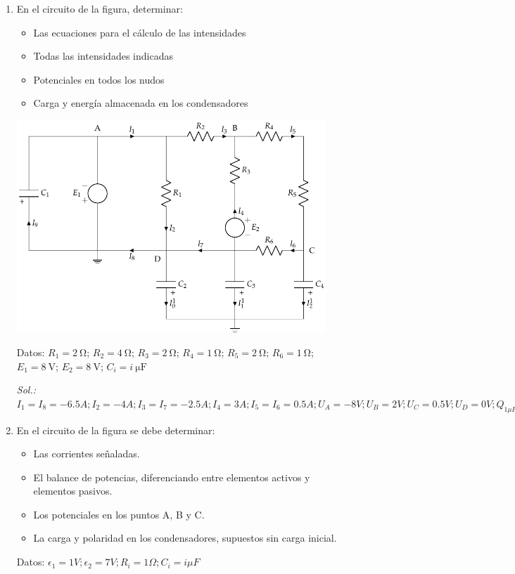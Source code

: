 \begin{enumerate}
\item En el circuito de la figura, determinar:
  \begin{itemize}
  \item Las ecuaciones para el cálculo de las intensidades
  \item Todas las intensidades indicadas
  \item Potenciales en todos los nudos
  \item Carga y energía almacenada en los condensadores
  \end{itemize}
  
  \begin{center}
    \includegraphics[height=8cm]{../figs/ej11_BT1.pdf}
  \end{center}


  Datos: $R_1 = \qty{2}{\ohm}$; $R_2 = \qty{4}{\ohm}$; $R_3 = \qty{2}{\ohm}$; $R_4 = \qty{1}{\ohm}$; $R_5 = \qty{2}{\ohm}$; $R_6 = \qty{1}{\ohm}$; $E_1 = \qty{8}{\volt}$; $E_2 = \qty{8}{\volt}$; $C_i = \qty[parse-numbers=false]{i}{\micro\farad}$

  \emph{Sol.:
    $I_1=I_8=-6.5A; I_2=-4A; I_3=I_7=-2.5A; I_4=3A; I_5=I_6=0.5A; U_A=-8V;
    U_B=2V; U_C=0.5V; U_D=0V;Q_{1\mu F}=8\mu C; Q_{2\mu F}=Q_{3\mu
      F}=0\mu C; Q_{4\mu F}=-2\mu C; E_{1\mu F}=32\mu J; E_{2\mu
      F}=E_{3\mu F}=0 J; E_{4\mu F}=0.5\mu J$}

\item En el circuito de la figura se debe determinar:
  \begin{itemize}
  \item Las corrientes señaladas.
  \item El balance de potencias, diferenciando entre elementos activos
    y elementos pasivos.
  \item Los potenciales en los puntos A, B y C.
  \item La carga y polaridad en los condensadores, supuestos sin carga
    inicial.
  \end{itemize}
  Datos:
  $\epsilon_1 ={1}V; \epsilon_2 ={7}V; R_i = {1}\Omega; C_i = {i}{\mu
    F}$


\end{enumerate}
